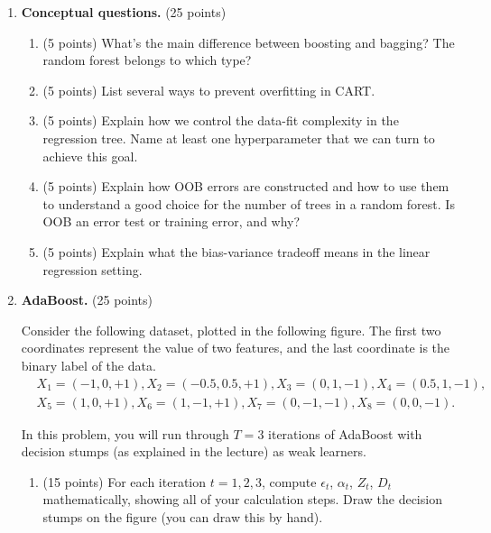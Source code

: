 \documentclass[twoside,10pt]{article}
\begin{document}
\begin{enumerate}[label*=\arabic*.]


\item {\bf Conceptual questions.} (25 points)

\begin{enumerate}[label*=\arabic*.]


\item (5 points) What's the main difference between boosting and bagging? The random forest belongs to which type?

\item (5 points) List several ways to prevent overfitting in CART.

\item (5 points) Explain how we control the data-fit complexity in the regression tree. Name at least one hyperparameter that we can turn to achieve this goal.

\item (5 points) Explain how OOB errors are constructed and how to use them to understand a good choice for the number of trees in a random forest. Is OOB an error test or training error, and why?


\item (5 points) Explain what the bias-variance tradeoff means in the linear regression setting. 

\end{enumerate}



\item  {\bf AdaBoost.} (25 points)

Consider the following dataset, plotted in the following figure. The first two coordinates represent the value of two features, and the last coordinate is the binary label of the data.
\begin{equation*}
\begin{split}
&X_1 = (-1, 0, +1), X_2 = (-0.5, 0.5, +1), X_3 = (0, 1, -1), X_4 = (0.5, 1, -1), \\
&X_5 = (1, 0, +1), X_6 = (1, -1, +1), X_7 = (0, -1, -1), X_8 = (0, 0, -1).
\end{split}
\end{equation*}

In this problem, you will run through $T = 3$ iterations of AdaBoost with decision stumps (as explained in the lecture) as weak learners.

\begin{enumerate}[label*=\arabic*.]
\item (15 points) For each iteration $t = 1, 2, 3$, compute $\epsilon_t$, $\alpha_t$, $Z_t$, $D_t$ mathematically, showing all of your calculation steps. Draw the decision stumps on the figure (you can draw this by hand). 


\end{enumerate}
\end{enumerate}
\end{document}
